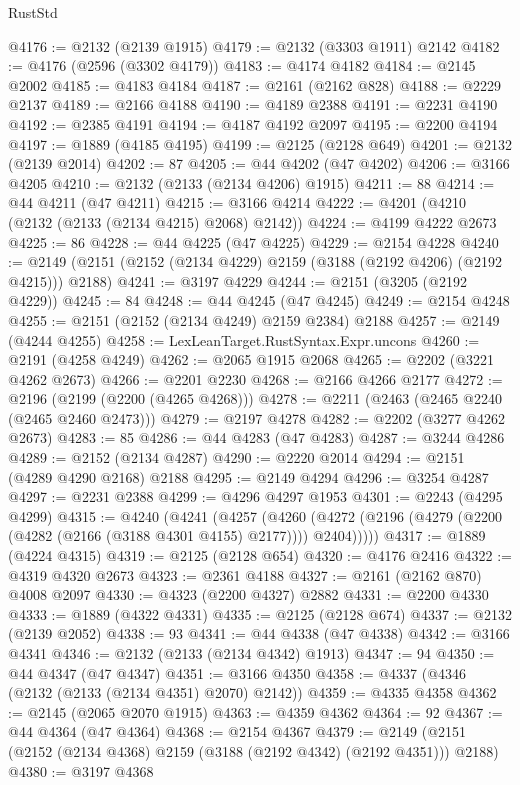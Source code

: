 \begin{lexlean}{RustStd}
\begin{coremodule}
@4176 := @2132 (@2139 @1915)
@4179 := @2132 (@3303 @1911) @2142
@4182 := @4176 (@2596 (@3302 @4179))
@4183 := @4174 @4182
@4184 := @2145 @2002
@4185 := @4183 @4184
@4187 := @2161 (@2162 @828)
@4188 := @2229 @2137
@4189 := @2166 @4188
@4190 := @4189 @2388
@4191 := @2231 @4190
@4192 := @2385 @4191
@4194 := @4187 @4192 @2097
@4195 := @2200 @4194
@4197 := @1889 (@4185 @4195)
@4199 := @2125 (@2128 @649)
@4201 := @2132 (@2139 @2014)
@4202 := 87
@4205 := @44 @4202 (@47 @4202)
@4206 := @3166 @4205
@4210 := @2132 (@2133 (@2134 @4206) @1915)
@4211 := 88
@4214 := @44 @4211 (@47 @4211)
@4215 := @3166 @4214
@4222 := @4201 (@4210 (@2132 (@2133 (@2134 @4215) @2068) @2142))
@4224 := @4199 @4222 @2673
@4225 := 86
@4228 := @44 @4225 (@47 @4225)
@4229 := @2154 @4228
@4240 := @2149 (@2151 (@2152 (@2134 @4229) @2159 (@3188 (@2192 @4206) (@2192 @4215))) @2188)
@4241 := @3197 @4229
@4244 := @2151 (@3205 (@2192 @4229))
@4245 := 84
@4248 := @44 @4245 (@47 @4245)
@4249 := @2154 @4248
@4255 := @2151 (@2152 (@2134 @4249) @2159 @2384) @2188
@4257 := @2149 (@4244 @4255)
@4258 := LexLeanTarget.RustSyntax.Expr.uncons
@4260 := @2191 (@4258 @4249)
@4262 := @2065 @1915 @2068
@4265 := @2202 (@3221 @4262 @2673)
@4266 := @2201 @2230
@4268 := @2166 @4266 @2177
@4272 := @2196 (@2199 (@2200 (@4265 @4268)))
@4278 := @2211 (@2463 (@2465 @2240 (@2465 @2460 @2473)))
@4279 := @2197 @4278
@4282 := @2202 (@3277 @4262 @2673)
@4283 := 85
@4286 := @44 @4283 (@47 @4283)
@4287 := @3244 @4286
@4289 := @2152 (@2134 @4287)
@4290 := @2220 @2014
@4294 := @2151 (@4289 @4290 @2168) @2188
@4295 := @2149 @4294
@4296 := @3254 @4287
@4297 := @2231 @2388
@4299 := @4296 @4297 @1953
@4301 := @2243 (@4295 @4299)
@4315 := @4240
    (@4241
      (@4257
        (@4260 (@4272 (@2196 (@4279 (@2200 (@4282 (@2166 (@3188 @4301 @4155) @2177)))) @2404)))))
@4317 := @1889 (@4224 @4315)
@4319 := @2125 (@2128 @654)
@4320 := @4176 @2416
@4322 := @4319 @4320 @2673
@4323 := @2361 @4188
@4327 := @2161 (@2162 @870) @4008 @2097
@4330 := @4323 (@2200 @4327) @2882
@4331 := @2200 @4330
@4333 := @1889 (@4322 @4331)
@4335 := @2125 (@2128 @674)
@4337 := @2132 (@2139 @2052)
@4338 := 93
@4341 := @44 @4338 (@47 @4338)
@4342 := @3166 @4341
@4346 := @2132 (@2133 (@2134 @4342) @1913)
@4347 := 94
@4350 := @44 @4347 (@47 @4347)
@4351 := @3166 @4350
@4358 := @4337 (@4346 (@2132 (@2133 (@2134 @4351) @2070) @2142))
@4359 := @4335 @4358
@4362 := @2145 (@2065 @2070 @1915)
@4363 := @4359 @4362
@4364 := 92
@4367 := @44 @4364 (@47 @4364)
@4368 := @2154 @4367
@4379 := @2149 (@2151 (@2152 (@2134 @4368) @2159 (@3188 (@2192 @4342) (@2192 @4351))) @2188)
@4380 := @3197 @4368

\end{coremodule}
\end{lexlean}
